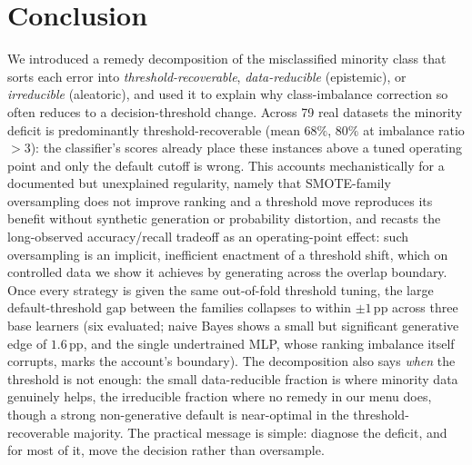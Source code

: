 \section{Conclusion}\label{sec:conclusion}

We introduced a remedy decomposition of the misclassified minority class that sorts
each error into \emph{threshold-recoverable}, \emph{data-reducible} (epistemic), or
\emph{irreducible} (aleatoric), and used it to explain why class-imbalance
correction so often reduces to a decision-threshold change. Across 79 real datasets
the minority deficit is predominantly threshold-recoverable (mean $68\%$, $80\%$ at
imbalance ratio $>3$): the classifier's scores already place these instances above
a tuned operating point and only the default cutoff is wrong. This accounts mechanistically for a documented but
unexplained regularity, namely that SMOTE-family oversampling does not improve ranking
and a threshold
move reproduces its benefit without synthetic generation or probability
distortion, and
recasts the long-observed accuracy/recall tradeoff as an operating-point effect:
such oversampling is an implicit, inefficient enactment of a threshold shift, which on
controlled data we show it achieves by generating across the overlap boundary. Once
every strategy is given the same out-of-fold threshold tuning, the large
default-threshold gap between the families collapses to within $\pm1$\,pp across
three base learners (six evaluated; naive Bayes shows a small but significant
generative edge of $1.6$\,pp, and the single undertrained MLP, whose ranking
imbalance itself corrupts, marks the account's boundary). The
decomposition also says \emph{when} the threshold is not enough: the small
data-reducible fraction is where minority data genuinely helps, the irreducible
fraction where no remedy in our menu does, though a strong non-generative default is
near-optimal in the threshold-recoverable majority. The practical message is simple:
diagnose the deficit, and for most of it, move the decision rather than oversample.
